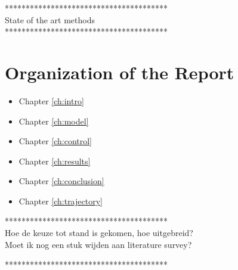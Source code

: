             ***************************************\\

State of the art methods\\


***************************************\\

\section{Organization of the Report}
\begin{itemize}
	\item Chapter \ref{ch:intro}
	\item Chapter \ref{ch:model}
	\item Chapter \ref{ch:control}
	\item Chapter \ref{ch:results}
	\item Chapter \ref{ch:conclusion}
	\item Chapter \ref{ch:trajectory}
\end{itemize}

***************************************\\
Hoe de keuze tot stand is gekomen, hoe uitgebreid? \\
Moet ik nog een stuk wijden aan literature survey?

***************************************\\